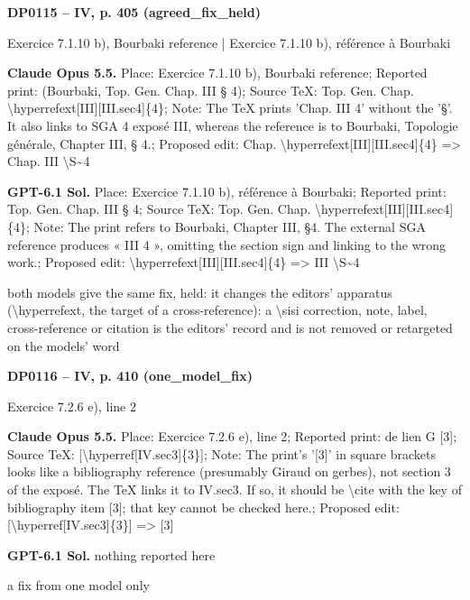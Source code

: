 \par\noindent\hypertarget{DP0115}{}\textbf{DP0115 -- IV, p. 405 (agreed\_fix\_held)}\par
Exercice 7.1.10 b), Bourbaki reference | Exercice 7.1.10 b), référence à Bourbaki\par
\textbf{Claude Opus 5.5.} Place: Exercice 7.1.10 b), Bourbaki reference; Reported print: (Bourbaki, Top. Gen. Chap. III § 4); Source TeX: Top. Gen. Chap. \textbackslash{}hyperrefext[III][III.sec4]\{4\}; Note: The TeX prints 'Chap. III 4' without the '§'. It also links to SGA 4 exposé III, whereas the reference is to Bourbaki, Topologie générale, Chapter III, § 4.; Proposed edit: Chap. \textbackslash{}hyperrefext[III][III.sec4]\{4\} =\allowbreak > Chap. III \textbackslash{}S\textasciitilde{}4\par
\textbf{GPT-6.1 Sol.} Place: Exercice 7.1.10 b), référence à Bourbaki; Reported print: Top. Gen. Chap. III § 4; Source TeX: Top. Gen. Chap. \textbackslash{}hyperrefext[III][III.sec4]\{4\}; Note: The print refers to Bourbaki, Chapter III, §4. The external SGA reference produces « III 4 », omitting the section sign and linking to the wrong work.; Proposed edit: \textbackslash{}hyperrefext[III][III.sec4]\{4\} =\allowbreak > III \textbackslash{}S\textasciitilde{}4\par
both models give the same fix, held: it changes the editors' apparatus (\textbackslash{}hyperrefext, the target of a cross-reference): a \textbackslash{}sisi correction, note, label, cross-reference or citation is the editors' record and is not removed or retargeted on the models' word\par
\par\noindent\hypertarget{DP0116}{}\textbf{DP0116 -- IV, p. 410 (one\_model\_fix)}\par
Exercice 7.2.6 e), line 2\par
\textbf{Claude Opus 5.5.} Place: Exercice 7.2.6 e), line 2; Reported print: de lien G [3]; Source TeX: [\textbackslash{}hyperref[IV.sec3]\{3\}]; Note: The print's '[3]' in square brackets looks like a bibliography reference (presumably Giraud on gerbes), not section 3 of the exposé. The TeX links it to IV.sec3. If so, it should be \textbackslash{}cite with the key of bibliography item [3]; that key cannot be checked here.; Proposed edit: [\textbackslash{}hyperref[IV.sec3]\{3\}] =\allowbreak > [3]\par
\textbf{GPT-6.1 Sol.} nothing reported here\par
a fix from one model only\par
